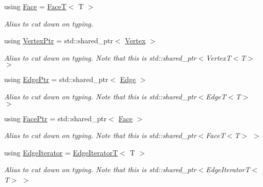 \begin{DoxyCompactItemize}
using \hyperlink{classDcel_1_1VertexT_a455510a8591a4e0f235b2049deb96e08}{Face} = \hyperlink{classDcel_1_1FaceT}{FaceT}$<$ T $>$
\begin{DoxyCompactList}\small\item\em Alias to cut down on typing. \end{DoxyCompactList}\item 
\mbox{\label{classDcel_1_1VertexT_aa7d02695a42762b98a66c559e6d3d849}} 
using \hyperlink{classDcel_1_1VertexT_aa7d02695a42762b98a66c559e6d3d849}{Vertex\+Ptr} = std\+::shared\+\_\+ptr$<$ \hyperlink{classDcel_1_1VertexT_a2c8a221a9f03e9bafa891bd0759b4f8f}{Vertex} $>$
\begin{DoxyCompactList}\small\item\em Alias to cut down on typing. Note that this is std\+::shared\+\_\+ptr$<$Vertex\+T$<$\+T$>$ $>$ \end{DoxyCompactList}\item 
\mbox{\label{classDcel_1_1VertexT_a7c049a24ac43b9750578e4f4ed543831}} 
using \hyperlink{classDcel_1_1VertexT_a7c049a24ac43b9750578e4f4ed543831}{Edge\+Ptr} = std\+::shared\+\_\+ptr$<$ \hyperlink{classDcel_1_1VertexT_abe1079747424916a164ec68b46333fc3}{Edge} $>$
\begin{DoxyCompactList}\small\item\em Alias to cut down on typing. Note that this is std\+::shared\+\_\+ptr$<$Edge\+T$<$\+T$>$ $>$ \end{DoxyCompactList}\item 
\mbox{\label{classDcel_1_1VertexT_a5acb4c66c49319683c71f52e56ad8e8a}} 
using \hyperlink{classDcel_1_1VertexT_a5acb4c66c49319683c71f52e56ad8e8a}{Face\+Ptr} = std\+::shared\+\_\+ptr$<$ \hyperlink{classDcel_1_1VertexT_a455510a8591a4e0f235b2049deb96e08}{Face} $>$
\begin{DoxyCompactList}\small\item\em Alias to cut down on typing. Note that this is std\+::shared\+\_\+ptr$<$Face\+T$<$\+T$>$ $>$ \end{DoxyCompactList}\item 
\mbox{\label{classDcel_1_1VertexT_abf182ec635351e107cd474df25b6ba73}} 
using \hyperlink{classDcel_1_1VertexT_abf182ec635351e107cd474df25b6ba73}{Edge\+Iterator} = \hyperlink{classDcel_1_1EdgeIteratorT}{Edge\+IteratorT}$<$ T $>$
\begin{DoxyCompactList}\small\item\em Alias to cut down on typing. Note that this is std\+::shared\+\_\+ptr$<$Edge\+Iterator\+T$<$\+T$>$ $>$ \end{DoxyCompactList}\end{DoxyCompactItemize}
